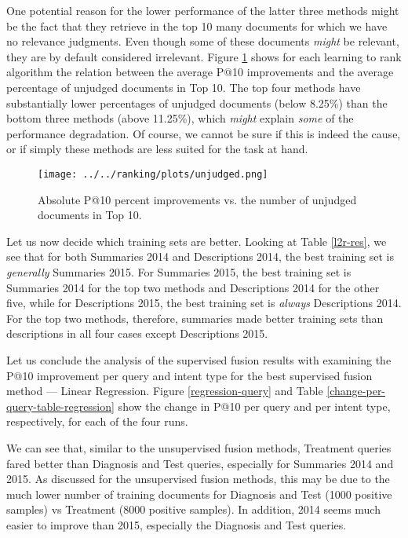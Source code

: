 One potential reason for the lower performance of the latter three methods might be the fact that they retrieve in the top 10
many documents for which we have no relevance judgments. Even though some of these documents \emph{might} be relevant,
they are by default considered irrelevant.
Figure \ref{unjudged-fig} shows for each learning to rank algorithm
the relation between the average P@10 improvements and the average
percentage of unjudged documents in Top 10. The top four methods
have substantially lower percentages of unjudged documents (below 8.25\%) than the bottom
three methods (above 11.25\%), which \emph{might} explain \emph{some} of the performance degradation.
Of course, we cannot
be sure if this is indeed the cause, or if simply these methods are less suited for the task at hand.

\begin{figure}
\centerline{
  \texttt{[image: ../../ranking/plots/unjudged.png]}
  }
  \caption{Absolute P@10 percent improvements vs. the number of unjudged documents in Top 10.}
  \label{unjudged-fig}
\end{figure}

Let us now decide which training sets are better.
Looking at Table \ref{l2r-res}, we see that for both Summaries 2014 and Descriptions 2014, the best
training set is \emph{generally} Summaries 2015.
For Summaries 2015, the best training set
is Summaries 2014 for the top two methods and Descriptions 2014 for the other five,
while for Descriptions 2015, the best training set is \emph{always} Descriptions 2014.
For the top two methods, therefore, summaries made better training sets than descriptions in all
four cases except Descriptions 2015.

Let us conclude the analysis of the supervised fusion results with examining the P@10 improvement per query
and intent type
for the best supervised fusion method --- Linear Regression. Figure \ref{regression-query} and Table
\ref{change-per-query-table-regression} show the change in P@10
per query and per intent type, respectively, for each of the four runs.

We can see that, similar to the unsupervised fusion methods,
Treatment queries fared better than Diagnosis and Test queries, especially for Summaries 2014 and 2015.
As discussed for the unsupervised fusion methods, this may be due to the much lower number of training
documents for Diagnosis and Test (1000 positive samples) vs Treatment (8000 positive samples).
In addition, 2014 seems much easier to improve than 2015, especially the Diagnosis and Test queries.

